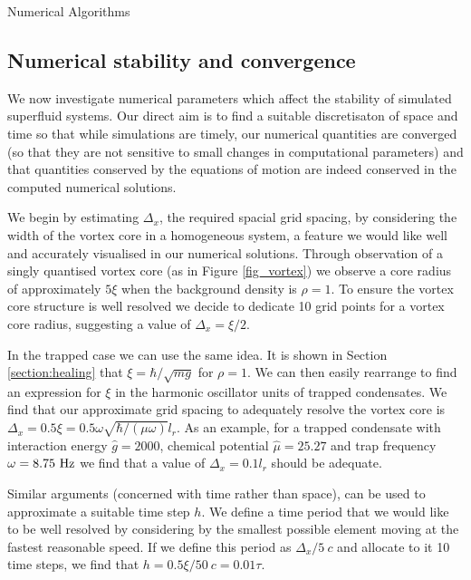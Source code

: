 \begin{chapter}{\label{cha:numerics}Numerical Algorithms}
	\subsection{\label{section:numericalParams} Numerical stability and convergence}
	We now investigate numerical parameters which affect the stability of simulated superfluid systems. Our direct aim is to find a suitable discretisaton of space and time so that while simulations are timely, our numerical quantities are converged (so that they are not sensitive to small changes in computational parameters) and that quantities conserved by the equations of motion are indeed conserved in the computed numerical solutions.

	We begin by estimating $\Delta_x$, the required spacial grid spacing, by considering the width of the vortex core in a homogeneous system, a feature we would like well and accurately visualised in our numerical solutions. Through observation of a singly quantised vortex core (as in Figure \ref{fig_vortex}) we observe a core radius of approximately $5\xi$ when the background density is $\rho=1$. To ensure the vortex core structure is well resolved we decide to dedicate 10 grid points for a vortex core radius, suggesting a value of $\Delta_x = \xi/2$.

	In the trapped case we can use the same idea. It is shown in Section \ref{section:healing} that $\xi = \hbar/\sqrt{mg}$ for $\rho=1$. We can then easily rearrange to find an expression for $\xi$ in the harmonic oscillator units of trapped condensates. We find that our approximate grid spacing to adequately resolve the vortex core is $\Delta_x = 0.5\xi = 0.5\omega \sqrt{\hbar/(\mu \omega)} l_r$. As an example, for a trapped condensate with interaction energy $\hat{g}=2000$, chemical potential $\hat{\mu}=25.27$ and trap frequency $\omega=8.75~{\rm Hz}$ we find that a value of $\Delta_x=0.1l_r$ should be adequate. 

	Similar arguments (concerned with time rather than space), can be used to approximate a suitable time step $h$. We define a time period that we would like to be well resolved by considering by the smallest possible element moving at the fastest reasonable speed. If we define this period as $\Delta_x / 5~c$ and allocate to it 10 time steps, we find that $h = 0.5\xi/50~c = 0.01\tau$.


\end{chapter}
